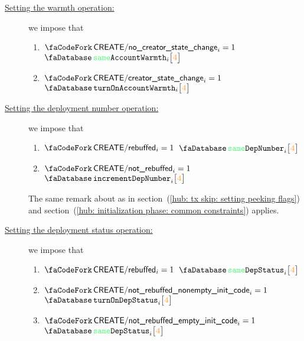 \begin{description}
\begin{enumerate}
		\end{enumerate}
	\item[\underline{Setting the warmth operation:}]
		we impose that
		\begin{enumerate}
			\item \If $\scenCreateNoCreatorStateChange _{i} = 1$ \Then $\accSameWarmth   {i}{\createFirstCreateeAccountRowOffset}$
			\item \If $\scenCreateCreatorStateChange   _{i} = 1$ \Then $\accTurnOnWarmth {i}{\createFirstCreateeAccountRowOffset}$
		\end{enumerate}
	\item[\underline{Setting the deployment number operation:}]
		we impose that
		\begin{enumerate}
			\item \If $\scenCreateRebuffed    _{i} = 1$ \Then $\accSameDeploymentNumber       {i}{\createFirstCreateeAccountRowOffset}$
			\item \If $\scenCreateNotRebuffed _{i} = 1$ \Then $\accIncrementDeploymentNumber  {i}{\createFirstCreateeAccountRowOffset}$
		\end{enumerate}
		\saNote{}
		The same remark about \accDeploymentNumber{} as in
		section~(\ref{hub: tx skip: setting peeking flags}) and
		section~(\ref{hub: initialization phase: common constraints}) applies.
	\item[\underline{Setting the deployment status operation:}]
		we impose that
		\begin{enumerate}
			\item \If $\scenCreateRebuffed    _{i} = 1$ \Then $\accSameDeploymentStatus       {i}{\createFirstCreateeAccountRowOffset}$
			\item \If $\scenCreateExecutionNonEmptyInitCode _{i} = 1$ \Then $\accTurnOnDepStatus {i}{\createFirstCreateeAccountRowOffset}$
			\item \If $\scenCreateExecutionEmptyInitCode    _{i} = 1$ \Then $\accSameDeploymentStatus   {i}{\createFirstCreateeAccountRowOffset}$
		\end{enumerate}
\end{description}

